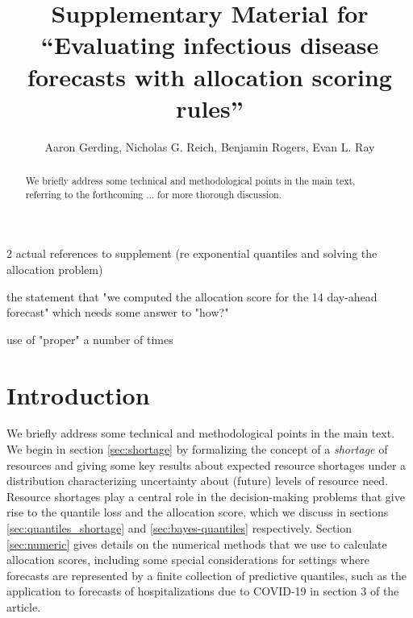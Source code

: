 \documentclass{article}
\title{Supplementary Material for ``Evaluating infectious disease forecasts with allocation scoring rules''}
\author{Aaron Gerding, Nicholas G. Reich, Benjamin Rogers, Evan L. Ray}
\begin{document}
\newcommand{\del}[2]{\frac{\partial {#1} }{\partial {#2}} }
\newcommand{\dby}[2]{\frac{d {#1} }{d {#2}} }
\newcommand{\sbar}{\overline{s}}

\newtheorem{proposition}{Proposition}

\theoremstyle{remark}
\newtheorem*{remark}{Remark}

\maketitle

\tableofcontents

\begin{todolist}
\item 2 actual references to supplement (re exponential quantiles and solving the allocation problem)
\item the statement that "we computed the allocation score for the 14 day-ahead forecast" which needs some answer to "how?"
\item use of "proper" a number of times
\end{todolist}

\begin{abstract}
We briefly address some technical and methodological points in the main text, referring to the forthcoming ... for 
more thorough discussion.
\end{abstract}


\section{Introduction}
\label{sec:intro}

We briefly address some technical and methodological points in the main text. We begin in section \ref{sec:shortage} by formalizing the concept of a \emph{shortage} of resources and giving some key results about expected resource shortages under a distribution characterizing uncertainty about (future) levels of resource need. Resource shortages play a central role in the decision-making problems that give rise to the quantile loss and the allocation score, which we discuss in sections \ref{sec:quantiles_shortage} and \ref{sec:bayes-quantiles} respectively. Section \ref{sec:numeric} gives details on the numerical methods that we use to calculate allocation scores, including some special considerations for settings where forecasts are represented by a finite collection of predictive quantiles, such as the application to forecasts of hospitalizations due to COVID-19 in section 3 of the article.
\end{document}
